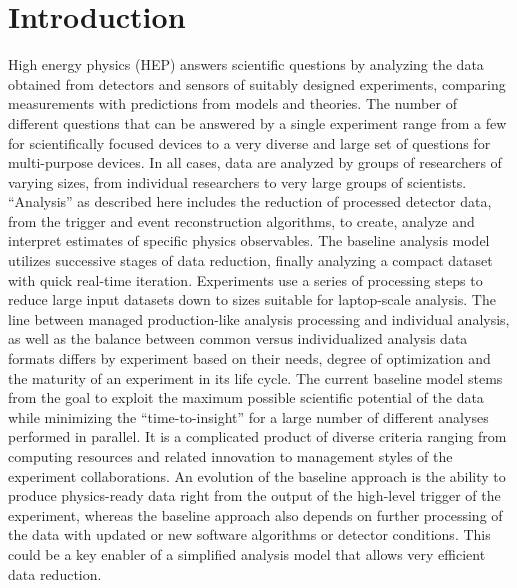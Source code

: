 \documentclass[12pt,a4paper]{article}
\begin{document}
\maketitle

\newpage

\section{Introduction}

High energy physics (HEP) answers scientific questions by analyzing the data obtained from detectors and sensors of suitably designed experiments, comparing measurements with predictions from models and theories. The number of different questions that can be answered by a single experiment range from a few for scientifically focused devices to a very diverse and large set of questions for multi-purpose devices. In all cases, data are analyzed by groups of researchers of varying sizes, from individual researchers to very large groups of scientists. ``Analysis'' as described here includes the reduction of processed detector data, from the trigger and event reconstruction algorithms, to create, analyze and interpret estimates of specific physics observables. The baseline analysis model utilizes successive stages of data reduction, finally analyzing a compact dataset with quick real-time iteration. Experiments use a series of processing steps to reduce large input datasets down to sizes suitable for laptop-scale analysis. The line between managed production-like analysis processing and individual analysis, as well as the balance between common versus individualized analysis data formats differs by experiment based on their needs, degree of optimization and the maturity of an experiment in its life cycle. The current baseline model stems from the goal to exploit the maximum possible scientific potential of the data while minimizing the ``time-to-insight'' for a large number of different analyses performed in parallel. It is a complicated product of diverse criteria ranging from computing resources and related innovation to management styles of the experiment collaborations. An evolution of the baseline approach is the ability to produce physics-ready data right from the output of the high-level trigger of the experiment, whereas the baseline approach also depends on further processing of the data with updated or new software algorithms or detector conditions. This could be a key enabler of a simplified analysis model that allows very efficient data reduction.
\end{document}
